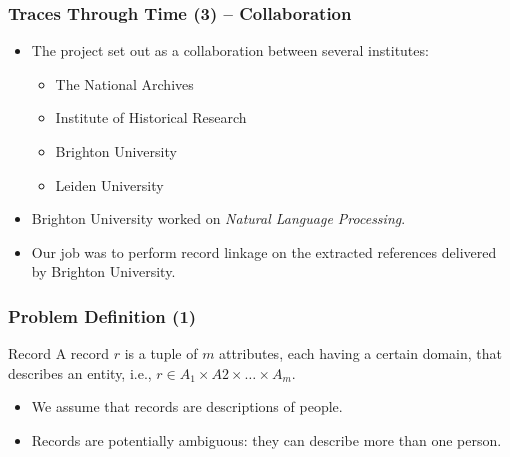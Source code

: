 \documentclass[12pt]{beamer}
\theoremstyle{break}
\begin{document}


\begin{frame}
	\frametitle{Traces Through Time (3) -- Collaboration}
	
	\begin{itemize}
		\item The project set out as a collaboration between several institutes: \begin{itemize}
			\item The National Archives
			\item Institute of Historical Research
			\item Brighton University
			\item Leiden University
			\end{itemize}
		\item Brighton University worked on \emph{Natural Language Processing}.
		\item Our job was to perform record linkage on the extracted references delivered by Brighton University.
	\end{itemize}
	
\end{frame}



\begin{frame}
	\frametitle{Problem Definition (1)}
	
	\begin{block}{Record}
		A record $r$ is a tuple of $m$ attributes, each having a certain domain, that describes an entity, i.e., $r \in A_1 \times A2 \times \dots \times A_m$.
	\end{block}
	
	\begin{itemize}
	  	\item We assume that records are \alert{descriptions} of people.
	  	\item Records are potentially \alert{ambiguous}: they can describe more than one person.
	\end{itemize}
	
\end{frame}


\end{document}
